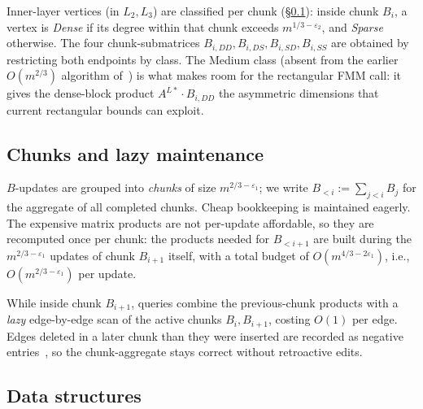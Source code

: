 \documentclass[sigconf,nonacm]{acmart}
\theoremstyle{plain}
\theoremstyle{definition}
\begin{document}
Inner-layer vertices (in $L_2, L_3$) are classified per chunk
(\S\ref{sec:warmup:chunks}): inside chunk $B_i$, a vertex is
\emph{Dense} if its degree within that chunk exceeds
$m^{1/3-\varepsilon_2}$, and \emph{Sparse} otherwise. The four
chunk-submatrices $B_{i,DD}, B_{i,DS}, B_{i,SD}, B_{i,SS}$ are
obtained by restricting both endpoints by class. The Medium class
(absent from the earlier $O(m^{2/3})$ algorithm
of~\cite{HHH22}) is what makes room for the rectangular FMM
call: it gives the dense-block product
$A^{L*}\!\cdot\!B_{i,DD}$ the asymmetric dimensions that current
rectangular bounds can exploit.

\subsection{Chunks and lazy maintenance}
\label{sec:warmup:chunks}
$B$-updates are grouped into \emph{chunks} of size
$m^{2/3-\varepsilon_1}$; we write
$B_{<i} := \sum_{j<i} B_j$ for the aggregate of all completed
chunks. Cheap bookkeeping is maintained eagerly. The expensive
matrix products are not per-update affordable, so they are
recomputed once per chunk: the products needed for $B_{<i+1}$ are
built during the $m^{2/3-\varepsilon_1}$ updates of chunk
$B_{i+1}$ itself, with a total budget of
$O(m^{4/3-2\varepsilon_1})$, i.e., $O(m^{2/3-\varepsilon_1})$
per update.

While inside chunk $B_{i+1}$, queries combine the previous-chunk
products with a \emph{lazy} edge-by-edge scan of the active
chunks $B_i, B_{i+1}$, costing $O(1)$ per edge. Edges deleted in a
later chunk than they were inserted are recorded as negative
entries~\cite[\S3.3]{AssadiShah25}, so the chunk-aggregate stays
correct without retroactive edits.

\subsection{Data structures}
\label{sec:warmup:datastructures}
\end{document}
